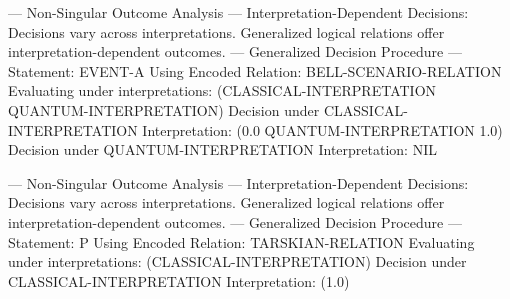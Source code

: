 --- Non-Singular Outcome Analysis --- Interpretation-Dependent
Decisions: Decisions vary across interpretations. Generalized logical
relations offer interpretation-dependent outcomes. --- Generalized
Decision Procedure --- Statement: EVENT-A Using Encoded Relation:
BELL-SCENARIO-RELATION Evaluating under interpretations:
(CLASSICAL-INTERPRETATION QUANTUM-INTERPRETATION) Decision under
CLASSICAL-INTERPRETATION Interpretation: (0.0 QUANTUM-INTERPRETATION
1.0) Decision under QUANTUM-INTERPRETATION Interpretation: NIL

--- Non-Singular Outcome Analysis --- Interpretation-Dependent
Decisions: Decisions vary across interpretations. Generalized logical
relations offer interpretation-dependent outcomes. --- Generalized
Decision Procedure --- Statement: P Using Encoded Relation:
TARSKIAN-RELATION Evaluating under interpretations:
(CLASSICAL-INTERPRETATION) Decision under CLASSICAL-INTERPRETATION
Interpretation: (1.0)

